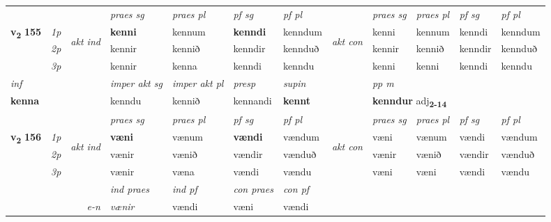 \begin{longtable}[l]{X>{\footnotesize\itshape}llXXXXlXXXX}
 & &   & \textit{praes sg}  & \textit{praes pl}    & \textit{ pf sg} & \textit{pf pl} & & \textit{praes sg}  & \textit{praes pl}    & \textit{pf sg} & \textit{pf pl }  \\ \cmidrule{4-7} \cmidrule{9-12}
 \multirow{2}{*}{{{\textbf{v{\textsubscript{2}}} \Large{\textbf{155}}}}}  & 1p & \multirow{3}{*}{\begin{turn}{90}\textit{akt ind}\end{turn}} & \textbf{kenni} & kennum & \textbf{kenndi} & kenndum & \multirow{3}{*}{\begin{turn}{90}\textit{akt con}\end{turn}} &kenni & kennum & kenndi & kenndum\\*
 & 2p &  &  kennir  & kennið & kenndir & kennduð & & kennir & kennið & kenndir & kennduð \\*
 & 3p &  & kennir & kenna & kenndi & kenndu & & kenni & kenni& kenndi & kenndu \\*
\cmidrule{4-7} \cmidrule{9-12}

   {\textit{inf}} & &  & \textit{imper akt sg} & \textit{imper akt pl}   & \textit{presp} & \textit{supin}  && \textit{pp m} \\*
  {\textbf{kenna}} & && kenndu  & kennið   & kennandi &  \textbf{kennt}  && \multicolumn{2}{l}{\textbf{kenndur} adj\textbf{\textsubscript{2-14}}} \\*

\midrule

 & &   & \textit{praes sg}  & \textit{praes pl}    & \textit{ pf sg} & \textit{pf pl} & & \textit{praes sg}  & \textit{praes pl}    & \textit{pf sg} & \textit{pf pl }  \\ \cmidrule{4-7} \cmidrule{9-12}
 \multirow{2}{*}{{{\textbf{v{\textsubscript{2}}} \Large{\textbf{156}}}}}  & 1p & \multirow{3}{*}{\begin{turn}{90}\textit{akt ind}\end{turn}} & \textbf{væni} & vænum & \textbf{vændi} & vændum & \multirow{3}{*}{\begin{turn}{90}\textit{akt con}\end{turn}} &væni & vænum & vændi & vændum\\*
 & 2p &  &  vænir  & vænið & vændir & vænduð & & vænir & vænið & vændir & vænduð \\*
 & 3p &  & vænir & væna & vændi & vændu & & væni & væni& vændi & vændu \\*
\cmidrule{4-7} \cmidrule{9-12}

   && &  \textit{ind praes} & \textit{ind pf} & \textit{con praes} & \textit{con pf} \\*
\multicolumn{3}{r}{\textit{e-n}} & vænir & vændi & væni & vændi \\*


\end{longtable}
